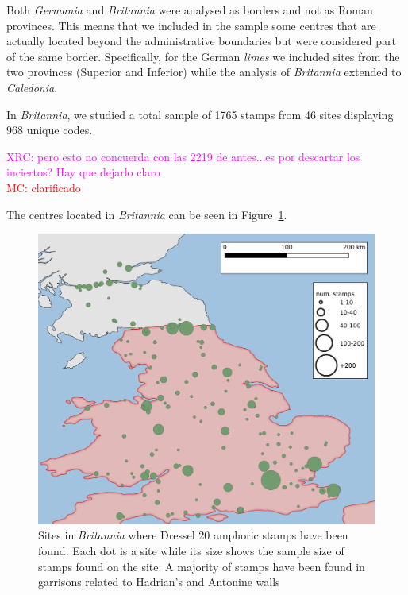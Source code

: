 \documentclass[review]{elsarticle}
\newcommand{\memo}[2]{\textcolor{#1}{#2}}
\newcommand{\maria}[1]{\memo{red}{MC: #1\\}}
\newcommand{\xavi}[1]{\memo{magenta}{XRC: #1\\}}
\begin{document}
Both \textit{Germania} and \textit{Britannia} were analysed as borders and not as Roman provinces. This means that we included in the sample some centres that are actually located beyond the administrative boundaries but were considered part of the same border. Specifically, for the German \textit{limes} we included sites from the two provinces (Superior and Inferior) while the analysis of \textit{Britannia} extended to \textit{Caledonia}.
 
In \textit{Britannia}, we studied a total sample of 1765 stamps from 46 sites displaying 968 unique codes.

\xavi{pero esto no concuerda con las 2219 de antes...es por descartar los inciertos? Hay que dejarlo claro}
\maria{clarificado}

The centres located in \textit{Britannia} can be seen in Figure~\ref{britannia}.
 
\begin{figure}[htp]
	\centering
\includegraphics[width=\linewidth]{figs/britannia}
\caption{Sites in \textit{Britannia} where Dressel 20 amphoric stamps have been found. Each dot is a site while its size shows the sample size of stamps found on the site. A majority of stamps have been found in garrisons related to Hadrian's and Antonine walls}
\label{britannia}
\end{figure} 
\end{document}
